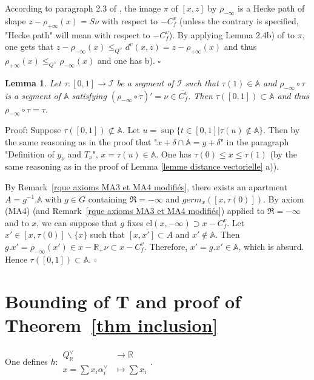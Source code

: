 \documentclass[12pt]{article}
\theoremstyle{plain}
\newtheorem{lemme}[thm]{Lemma}
\theoremstyle{definition}
\newcommand{\R}{\mathbb{R}}
\newcommand{\A}{\mathbb{A}}
\begin{document}
According to paragraph 2.3 of \cite{gaussent2014spherical}, the image $\pi$ of $[x,z]$ by $\rho_{-\infty}$ is a Hecke path of shape $z-\rho_{+\infty}(x)=S\nu$ with respect to $-C^v_f$ (unless the contrary is specified, "Hecke path" will mean with respect to $-C^v_f$). By applying Lemma 2.4b) of \cite{gaussent2014spherical} to $\pi$, one gets that $z-\rho_{-\infty}(x)\leq _{Q^\vee} d^v(x,z)=z-\rho_{+\infty}(x)$ and thus $\rho_{+\infty}(x)\leq_{Q^\vee} \rho_{-\infty}(x)$ and one has b). $\square$


\begin{lemme}\label{lemme image réciproque de segments}
Let $\tau:[0,1]\rightarrow \mathcal{I}$ be a segment of $\mathcal{I}$ such that $\tau(1)\in \mathbb{A}$ and $\rho_{-\infty}\circ\tau$ is a segment of $\mathbb{A}$ satisfying  $(\rho_{-\infty}\circ\tau)'=\nu\in \overline{C^v_f}$. Then $\tau([0,1])\subset \mathbb{A}$ and thus $\rho_{-\infty}\circ \tau=\tau$.
\end{lemme}

Proof: Suppose $\tau([0,1])\not\subset \A$. Let $u=\sup\{t\in [0,1]|\tau(u)\notin \A\}$. Then by the same reasoning as in the proof that "$x+\delta\cap\A=y+\delta$" in the paragraph "Definition of $y_\nu$ and $T_\nu$", $x=\tau(u)\in\A$. One has $\tau(0)\leq x\leq \tau(1)$ (by the same reasoning as in the proof of Lemma \ref{lemme distance vectorielle} a)). 

By Remark~\ref{rque axioms MA3 et MA4 modifiés}, there exists an apartment $A=g^{-1}.\A$ with $g\in G$ containing $\mathfrak{R}=-\infty$ and $germ_x([x,\tau(0)])$. By axiom (MA4) (and Remark~\ref{rque axioms MA3 et MA4 modifiés}) applied to $\mathfrak{R}=-\infty$ and to $x$, we can suppose that $g$ fixes $\mathrm{cl}(x,-\infty)\supset x-C_f^v$.  
Let $x'\in [x,\tau(0)]\backslash\{x\}$ such that $[x,x']\subset A$ and $x'\notin \A$. Then $g.x'=\rho_{-\infty}(x')\in x-\R_+\nu\subset x-C_f^v$. Therefore, $x'=g.x'\in \A$, which is absurd. Hence $\tau([0,1])\subset \A$. $\square$





\section{Bounding of T and proof of Theorem~\ref{thm inclusion} }\label{sect bounding of T}


One defines $h:\begin{aligned} Q^\vee_{\mathbb{R}}& \rightarrow \mathbb{R}\\
x=\sum x_i\alpha_i^\vee & \mapsto \sum x_i\end{aligned}.$
\end{document}
